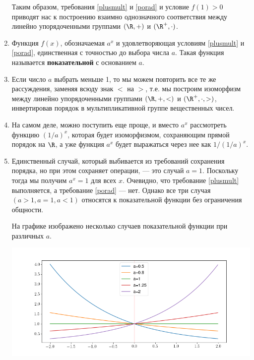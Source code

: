 \begin{enumerate}
Таким образом, требования \eqref{plusmult} и \eqref{porad} и условие $f(1)>0$ приводят нас к построению взаимно однозначного соответствия между линейно упорядоченными группами $(\R,+)$ и $(\R^+,\cdot)$.

\item Функция $f(x)$, обозначаемая $a^x$ и удовлетворяющая условиям \eqref{plusmult} и \eqref{porad}, единственная с точностью до выбора числа $a$. Такая функция называется \textbf{показательной} с основанием $a$.




\item Если число $a$ выбрать меньше 1, то мы можем повторить все те же рассуждения, заменяя всюду знак $<$ на $>$, т.е. мы построим изоморфизм между линейно упорядоченными группами $(\R,+,<)$ и $(\R^+,\cdot,>)$, инвертировав порядок в мультипликативной группе вещественных чисел.
\item На самом деле, можно поступить еще проще, и вместо $a^x$ рассмотреть функцию $(1/a)^x$, которая будет изоморфизмом, сохраняющим прямой порядок на $\R$, а уже функция $a^x$ будет выражаться через нее как $1/(1/a)^x$.
\item Единственный случай, который выбивается из требований сохранения порядка, но при этом сохраняет операции, --- это случай $a=1$. Поскольку тогда мы получим $a^x=1$ для всех $x$. Очевидно, что требование \eqref{plusmult} выполняется, а требование \eqref{porad} --- нет. Однако все три случая $(a>1,a=1,a<1)$ относятся к показательной функции без ограничения общности.

На графике изображено несколько случаев показательной функции при различных $a$.
\begin{center}
\includegraphics[scale=0.5]{exp.png}
\end{center}


\end{enumerate}

